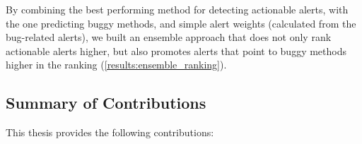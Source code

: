 By combining the best performing method for detecting actionable alerts, with the one predicting buggy methods, and simple alert weights (calculated from the bug-related alerts), we built an ensemble approach that does not only rank actionable alerts higher, but also promotes alerts that point to buggy methods higher in the ranking (\cref{results:ensemble_ranking}).


\subsection{Summary of Contributions}
 
This thesis provides the following contributions:
\begin{itemize}


\end{itemize}
